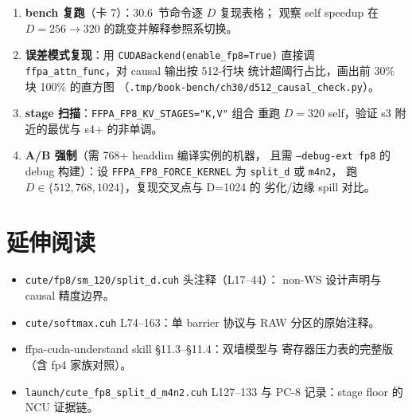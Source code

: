 \begin{enumerate}[itemsep=2pt,topsep=2pt]
  \item \textbf{bench 复跑}（卡 7）：30.6~节命令逐 $D$ 复现表格；
        观察 self speedup 在 $D=256\to320$ 的跳变并解释参照系切换。
  \item \textbf{误差模式复现}：用 \texttt{CUDABackend(enable\_fp8=True)}
        直接调 \texttt{ffpa\_attn\_func}，对 causal 输出按 512-行块
        统计超阈行占比，画出前 30\% 块 100\% 的直方图
        （\texttt{.tmp/book-bench/ch30/d512\_causal\_check.py}）。
  \item \textbf{stage 扫描}：\texttt{FFPA\_FP8\_KV\_STAGES="K,V"} 组合
        重跑 $D=320$ self，验证 s3 附近的最优与 s4+ 的非单调。
  \item \textbf{A/B 强制}（需 768+ headdim 编译实例的机器，
        且需 \texttt{--debug-ext fp8} 的 debug 构建）：设
        \texttt{FFPA\_FP8\_\allowbreak FORCE\_KERNEL} 为
        \texttt{split\_d} 或 \texttt{m4n2}，
        跑 $D\in\{512,768,1024\}$，复现交叉点与 D=1024 的
        劣化/边缘 spill 对比。
\end{enumerate}

\section*{延伸阅读}

\begin{itemize}[itemsep=0pt,topsep=2pt]
  \item \texttt{cute/fp8/sm\_120/split\_d.cuh} 头注释（L17--44）：
        non-WS 设计声明与 causal 精度边界。
  \item \texttt{cute/softmax.cuh} L74--163：单 barrier 协议与 RAW
        分区的原始注释。
  \item ffpa-cuda-understand skill \S11.3--\S11.4：双墙模型与
        寄存器压力表的完整版（含 fp4 家族对照）。
  \item \texttt{launch/cute\_fp8\_split\_d\_m4n2.cuh} L127--133 与
        PC-8 记录：stage floor 的 NCU 证据链。
\end{itemize}
